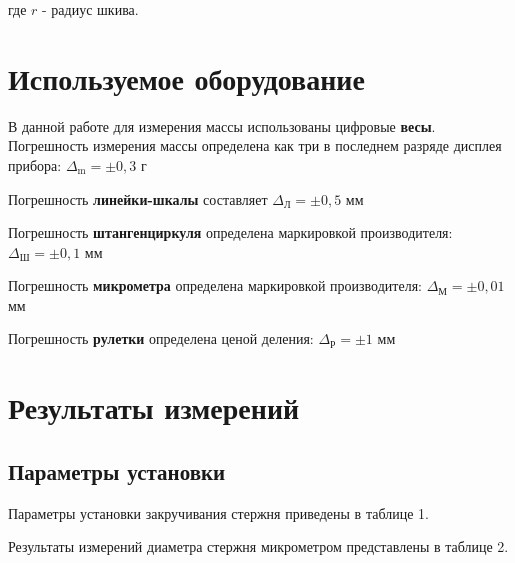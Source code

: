 \documentclass{article}
\begin{document}
где $r$ - радиус шкива. 

\section*{Используемое оборудование}

\hspace{4mm} В данной работе для измерения массы использованы цифровые \textbf{весы}. Погрешность измерения массы определена как три в последнем разряде дисплея прибора: $\Delta_{\text{m}} = \pm 0,3$ г

Погрешность \textbf{линейки-шкалы} составляет $\Delta_{\text{Л}} = \pm 0,5$ мм 

Погрешность \textbf{штангенциркуля} определена маркировкой производителя: $\Delta_{\text{Ш}} = \pm 0,1$ мм

Погрешность \textbf{микрометра} определена маркировкой производителя: $\Delta_{\text{М}} = \pm 0,01$ мм

Погрешность \textbf{рулетки} определена ценой деления: $\Delta_{\text{Р}} = \pm 1$ мм


\section*{Результаты измерений}

\subsection*{Параметры установки}

\hspace{4mm} Параметры установки закручивания стержня приведены в таблице 1.  

\begin{table}[h!]
	\centering
\end{table}

Результаты измерений диаметра стержня микрометром представлены в таблице 2.
\end{document}
